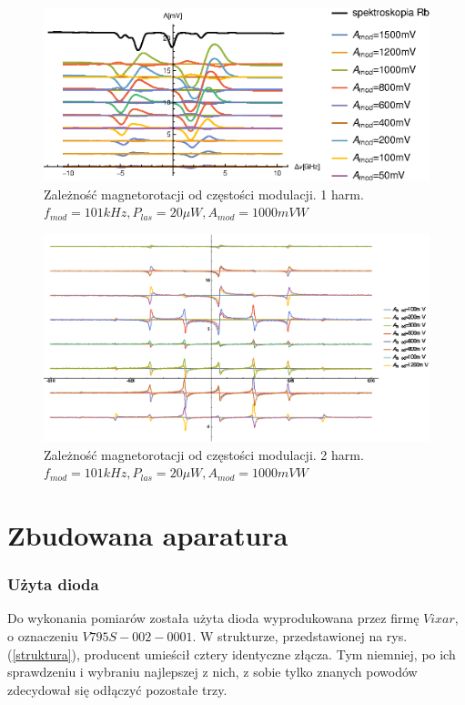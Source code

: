 \documentclass[a4paper,10pt]{article}
\begin{document}
\begin{figure}[h!]
\centering
 \includegraphics[width=\textwidth]{panoramy_1H_odam.eps}
 \caption{Zależność magnetorotacji od częstości modulacji. 1 harm. $f_{mod}=101kHz, P_{las}=20 \mu W, A_{mod}=1000mV W$}
 \label{fig:panodam1}
\end{figure}

\begin{figure}[h!]
\centering
 \includegraphics[width=\textwidth]{panoramy_2H_odam.eps}
 \caption{Zależność magnetorotacji od częstości modulacji. 2 harm. $f_{mod}=101kHz, P_{las}=20 \mu W, A_{mod}=1000mV W$}
 \label{fig:panodam2}
\end{figure}

\chapter{Zbudowana aparatura}
\label{ch:aparatura}
\subsection{Użyta dioda}


Do wykonania pomiarów została użyta dioda wyprodukowana przez firmę $Vixar$, o oznaczeniu $V795S-002-0001$.
W strukturze, przedstawionej na rys. (\ref{struktura}), producent umieścił cztery identyczne złącza. Tym niemniej, po ich sprawdzeniu i wybraniu najlepszej z nich, z sobie tylko znanych powodów zdecydował się odłączyć pozostałe trzy.
\end{document}
